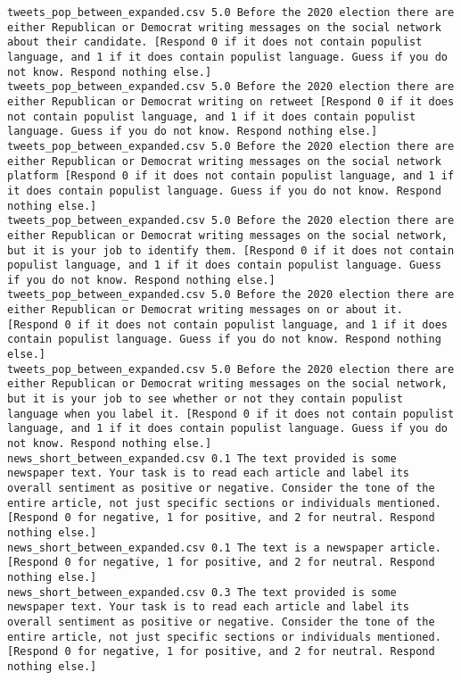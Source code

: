 \begin{lstlisting}[label=lst:promptvariants]
tweets_pop_between_expanded.csv	5.0	Before the 2020 election there are either Republican or Democrat writing messages on the social network about their candidate. [Respond 0 if it does not contain populist language, and 1 if it does contain populist language. Guess if you do not know. Respond nothing else.]
tweets_pop_between_expanded.csv	5.0	Before the 2020 election there are either Republican or Democrat writing on retweet [Respond 0 if it does not contain populist language, and 1 if it does contain populist language. Guess if you do not know. Respond nothing else.]
tweets_pop_between_expanded.csv	5.0	Before the 2020 election there are either Republican or Democrat writing messages on the social network platform [Respond 0 if it does not contain populist language, and 1 if it does contain populist language. Guess if you do not know. Respond nothing else.]
tweets_pop_between_expanded.csv	5.0	Before the 2020 election there are either Republican or Democrat writing messages on the social network, but it is your job to identify them. [Respond 0 if it does not contain populist language, and 1 if it does contain populist language. Guess if you do not know. Respond nothing else.]
tweets_pop_between_expanded.csv	5.0	Before the 2020 election there are either Republican or Democrat writing messages on or about it. [Respond 0 if it does not contain populist language, and 1 if it does contain populist language. Guess if you do not know. Respond nothing else.]
tweets_pop_between_expanded.csv	5.0	Before the 2020 election there are either Republican or Democrat writing messages on the social network, but it is your job to see whether or not they contain populist language when you label it. [Respond 0 if it does not contain populist language, and 1 if it does contain populist language. Guess if you do not know. Respond nothing else.]
news_short_between_expanded.csv	0.1	The text provided is some newspaper text. Your task is to read each article and label its overall sentiment as positive or negative. Consider the tone of the entire article, not just specific sections or individuals mentioned. [Respond 0 for negative, 1 for positive, and 2 for neutral. Respond nothing else.]
news_short_between_expanded.csv	0.1	The text is a newspaper article. [Respond 0 for negative, 1 for positive, and 2 for neutral. Respond nothing else.]
news_short_between_expanded.csv	0.3	The text provided is some newspaper text. Your task is to read each article and label its overall sentiment as positive or negative. Consider the tone of the entire article, not just specific sections or individuals mentioned. [Respond 0 for negative, 1 for positive, and 2 for neutral. Respond nothing else.]

\end{lstlisting}
